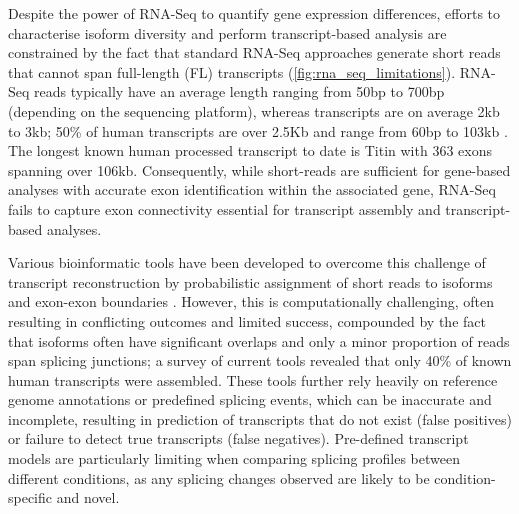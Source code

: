 Despite the power of RNA-Seq to quantify gene expression differences, efforts to characterise isoform diversity and perform transcript-based analysis are constrained by the fact that standard RNA-Seq approaches generate short reads that cannot span full-length (FL) transcripts (\cref{fig:rna_seq_limitations}). RNA-Seq reads typically have an average length ranging from 50bp to 700bp (depending on the sequencing platform), whereas transcripts are on average 2kb to 3kb; 50\% of human transcripts are over 2.5Kb\cite{Sharon2013} and range from 60bp to 103kb \cite{Piovesan2016,Sharon2013}. The longest known human processed transcript to date is Titin with 363 exons spanning over 106kb\cite{Bang2001}. Consequently, while short-reads are sufficient for gene-based analyses with accurate exon identification within the associated gene, RNA-Seq fails to capture exon connectivity essential for transcript assembly and transcript-based analyses\cite{Gordon2015, Wang2016}. 

Various bioinformatic tools have been developed to overcome this challenge of transcript reconstruction by probabilistic assignment of short reads to isoforms and exon-exon boundaries \cite{Trapnell2010, Kingsford2010, Au2013}. However, this is computationally challenging, often resulting in conflicting outcomes and limited success\cite{Steijger2013}, compounded by the fact that isoforms often have significant overlaps and only a minor proportion of reads span splicing junctions; a survey of current tools revealed that only 40\% of known human transcripts were assembled\cite{Steijger2013}. These tools further rely heavily on reference genome annotations or predefined splicing events, which can be inaccurate and incomplete, resulting in prediction of transcripts that do not exist (false positives) or failure to detect true transcripts (false negatives)\cite{Au2013}. Pre-defined transcript models are particularly limiting when comparing splicing profiles between different conditions, as any splicing changes observed are likely to be condition-specific and novel. 

